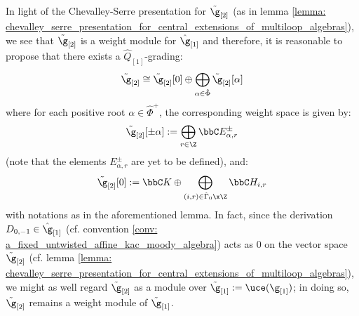 \begin{remark}
            In light of the Chevalley-Serre presentation for $\tilde{\g}_{[2]}$ (as in lemma \ref{lemma: chevalley_serre_presentation_for_central_extensions_of_multiloop_algebras}), we see that $\tilde{\g}_{[2]}$ is a weight module for $\hat{\g}_{[1]}$ and therefore, it is reasonable to propose that there exists a $\hat{Q}_{[1]}$-grading:
                $$\tilde{\g}_{[2]} \cong \tilde{\g}_{[2]}[0] \oplus \bigoplus_{\alpha \in \hat{\Phi}} \tilde{\g}_{[2]}[\alpha]$$
            where for each positive root $\alpha \in \hat{\Phi}^+$, the corresponding weight space is given by:
                $$\tilde{\g}_{[2]}[\pm \alpha] := \bigoplus_{r \in \Z} \bbC E_{\alpha, r}^{\pm}$$
            (note that the elements $E_{\alpha, r}^{\pm}$ are yet to be defined), and:
                $$\tilde{\g}_{[2]}[0] := \bbC K \oplus \bigoplus_{(i, r) \in \hat{\Gamma}_0 \x \Z} \bbC H_{i, r}$$
            with notations as in the aforementioned lemma. In fact, since the derivation $D_{0, -1} \in \hat{\g}_{[1]}$ (cf. convention \ref{conv: a_fixed_untwisted_affine_kac_moody_algebra}) acts as $0$ on the vector space $\tilde{\g}_{[2]}$ (cf. lemma \ref{lemma: chevalley_serre_presentation_for_central_extensions_of_multiloop_algebras}), we might as well regard $\tilde{\g}_{[2]}$ as a module over $\tilde{\g}_{[1]} := \uce(\g_{[1]})$; in doing so, $\tilde{\g}_{[2]}$ remains a weight module of $\tilde{\g}_{[1]}$. 
        \end{remark}
